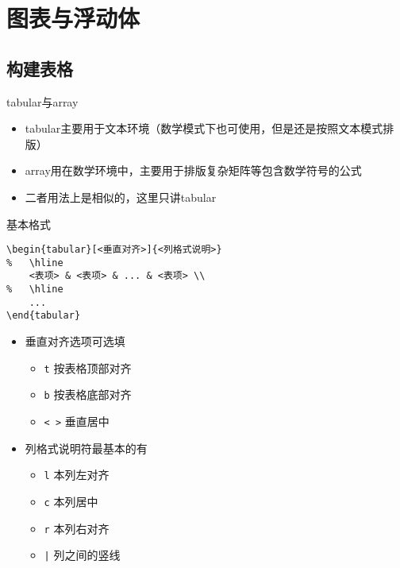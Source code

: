 \section{图表与浮动体}

\subsection{构建表格}
\begin{frame}{tabular与array}
	\begin{itemize}
		\item tabular主要用于文本环境（数学模式下也可使用，但是还是按照文本模式排版）
		\item array用在数学环境中，主要用于排版复杂矩阵等包含数学符号的公式
		\item 二者用法上是相似的，这里只讲tabular
	\end{itemize}
\end{frame}
\begin{frame}[fragile]{基本格式}
\begin{lstlisting}
\begin{tabular}[<垂直对齐>]{<列格式说明>}
%   \hline
    <表项> & <表项> & ... & <表项> \\
%   \hline
    ...
\end{tabular}
\end{lstlisting}
	\begin{itemize}
		\item 垂直对齐选项可选填
		\begin{itemize}
			\item \texttt{t} \qquad 按表格顶部对齐
			\item \texttt{b} \qquad 按表格底部对齐
			\item \texttt{< >} \quad 垂直居中
		\end{itemize}
		\item 列格式说明符最基本的有
		\begin{itemize}
			\item \texttt{l} \quad 本列左对齐
			\item \texttt{c} \quad 本列居中
			\item \texttt{r} \quad 本列右对齐
			\item \texttt{|} \quad 列之间的竖线
		\end{itemize}
	\end{itemize}
\end{frame}

